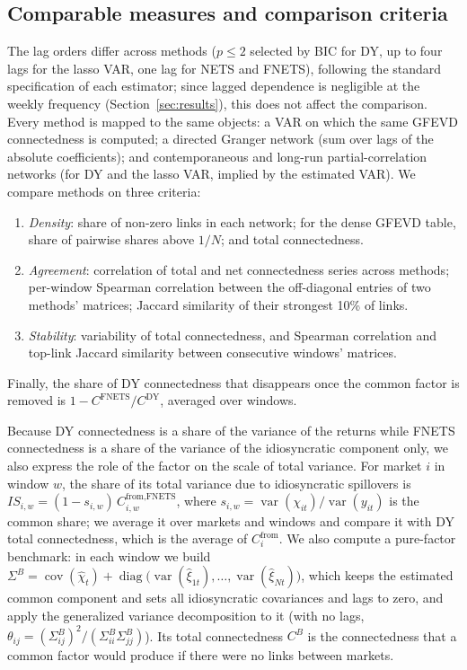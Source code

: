 \subsection{Comparable measures and comparison criteria}
The lag orders differ across methods ($p\le 2$ selected by BIC for DY, up to four lags for the lasso VAR, one lag for NETS and FNETS), following the standard specification of each estimator; since lagged dependence is negligible at the weekly frequency (Section~\ref{sec:results}), this does not affect the comparison. Every method is mapped to the same objects: a VAR on which the same GFEVD connectedness is computed; a directed Granger network (sum over lags of the absolute coefficients); and contemporaneous and long-run partial-correlation networks (for DY and the lasso VAR, implied by the estimated VAR). We compare methods on three criteria:
\begin{enumerate}
\item \emph{Density}: share of non-zero links in each network; for the dense GFEVD table, share of pairwise shares above $1/N$; and total connectedness.
\item \emph{Agreement}: correlation of total and net connectedness series across methods; per-window Spearman correlation between the off-diagonal entries of two methods' matrices; Jaccard similarity of their strongest 10\% of links.
\item \emph{Stability}: variability of total connectedness, and Spearman correlation and top-link Jaccard similarity between consecutive windows' matrices.
\end{enumerate}
Finally, the share of DY connectedness that disappears once the common factor is removed is $1 - C^{\text{FNETS}}/C^{\text{DY}}$, averaged over windows.

Because DY connectedness is a share of the variance of the returns while FNETS connectedness is a share of the variance of the idiosyncratic component only, we also express the role of the factor on the scale of total variance. For market $i$ in window $w$, the share of its total variance due to idiosyncratic spillovers is $IS_{i,w} = (1 - s_{i,w})\, C^{\text{from,FNETS}}_{i,w}$, where $s_{i,w} = \operatorname{var}(\chi_{it})/\operatorname{var}(y_{it})$ is the common share; we average it over markets and windows and compare it with DY total connectedness, which is the average of $C^{\text{from}}_i$. We also compute a pure-factor benchmark: in each window we build $\Sigma^{B} = \operatorname{cov}(\hat\chi_t) + \operatorname{diag}\big(\operatorname{var}(\hat\xi_{1t}),\dots,\operatorname{var}(\hat\xi_{Nt})\big)$, which keeps the estimated common component and sets all idiosyncratic covariances and lags to zero, and apply the generalized variance decomposition to it (with no lags, $\theta_{ij} = (\Sigma^B_{ij})^2/(\Sigma^B_{ii}\Sigma^B_{jj})$). Its total connectedness $C^{B}$ is the connectedness that a common factor would produce if there were no links between markets.

